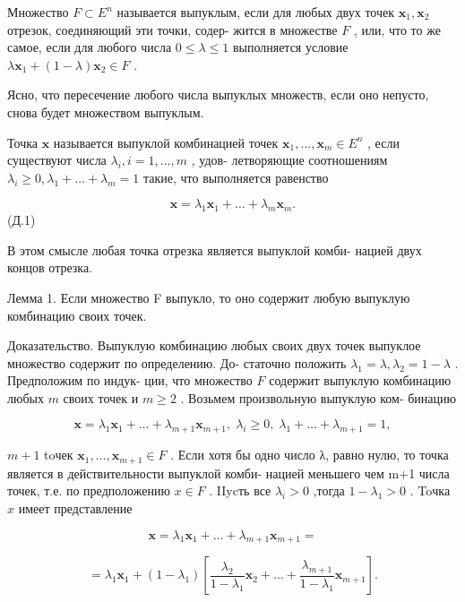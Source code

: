 \documentclass[8pt]{extarticle}
\begin{document}
Множество \(F \subset  {E}^{n}\) называется выпуклым, если для любых двух точек \({\mathbf{x}}_{1},{\mathbf{x}}_{2}\) отрезок, соединяющий эти точки, содер- жится в множестве \(F\) , или, что то же самое, если для любого числа \(0 \leq  \lambda  \leq  1\) выполняется условие \(\lambda {\mathbf{x}}_{1} + \left( {1 - \lambda }\right) {\mathbf{x}}_{2} \in  F\) .

Ясно, что пересечение любого числа выпуклых множеств, если оно непусто, снова будет множеством выпуклым.

Точка \(\mathbf{x}\) называется выпуклой комбинацией точек \({\mathbf{x}}_{1},\ldots ,{\mathbf{x}}_{m} \in  {E}^{n}\) , если существуют числа \({\lambda }_{i},i = 1,\ldots ,m\) , удов- летворяющие соотношениям \({\lambda }_{i} \geq  0,{\lambda }_{1} + \ldots  + {\lambda }_{m} = 1\) такие, что выполняется равенство

\[
\mathbf{x} = {\lambda }_{1}{\mathbf{x}}_{1} + \ldots  + {\lambda }_{m}{\mathbf{x}}_{m}.
\]
 (Д.1)

В этом смысле любая точка отрезка является выпуклой комби- нацией двух концов отрезка.

Лемма 1. Если множество F выпукло, то оно содержит любую выпуклую комбинацию своих точек.

Доказательство. Выпуклую комбинацию любых своих двух точек выпуклое множество содержит по определению. До- статочно положить \({\lambda }_{1} = \lambda ,{\lambda }_{2} = 1 - \lambda\) . Предположим по индук- ции, что множество \(F\) содержит выпуклую комбинацию любых \(m\) своих точек и \(m \geq  2\) . Возьмем произвольную выпуклую ком- бинацию

\[
\mathbf{x} = {\lambda }_{1}{\mathbf{x}}_{1} + \ldots  + {\lambda }_{m + 1}{\mathbf{x}}_{m + 1},\;{\lambda }_{i} \geq  0,\;{\lambda }_{1} + \ldots  + {\lambda }_{m + 1} = 1,
\]

\(m + 1\) toчек \({\mathbf{x}}_{1},\ldots ,{\mathbf{x}}_{m + 1} \in  F\) . Если хотя бы одно число λ, равно нулю, то точка является в действительности выпуклой комби- нацией меньшего чем m+1 числа точек, т.е. по предположению \(x \in  F\) . IIycть все \({\lambda }_{i} > 0\) ,тогда \(1 - {\lambda }_{1} > 0\) . Toчка \(x\) имеет представление

\[
\mathbf{x} = {\lambda }_{1}{\mathbf{x}}_{1} + \ldots  + {\lambda }_{m + 1}{\mathbf{x}}_{m + 1} =
\]

\[
= {\lambda }_{1}{\mathbf{x}}_{1} + \left( {1 - {\lambda }_{1}}\right) \left\lbrack  {\frac{{\lambda }_{2}}{1 - {\lambda }_{1}}{\mathbf{x}}_{2} + \ldots  + \frac{{\lambda }_{m + 1}}{1 - {\lambda }_{1}}{\mathbf{x}}_{m + 1}}\right\rbrack  .
\]
\end{document}
